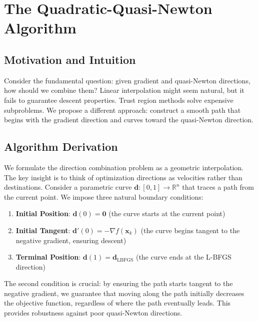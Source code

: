 \hypertarget{the-quadratic-quasi-newton-algorithm}{%
\section{The Quadratic-Quasi-Newton Algorithm}\label{the-quadratic-quasi-newton-algorithm}}

\hypertarget{motivation-and-intuition}{%
\subsection{Motivation and Intuition}\label{motivation-and-intuition}}

Consider the fundamental question: given gradient and quasi-Newton directions, how should we combine them?
Linear interpolation might seem natural, but it fails to guarantee descent properties.
Trust region methods solve expensive subproblems.
We propose a different approach: construct a smooth path that begins with the gradient direction and curves toward the quasi-Newton direction.

\hypertarget{algorithm-derivation}{%
\subsection{Algorithm Derivation}\label{algorithm-derivation}}

We formulate the direction combination problem as a geometric interpolation. The key insight is to think of optimization directions as velocities rather than destinations. Consider a parametric curve
\(\mathbf{d}: [0,1] \rightarrow \mathbb{R}^n\) that traces a path from the current point. We impose three natural boundary conditions:

\begin{enumerate}
\def\labelenumi{\arabic{enumi}.}
\tightlist
\item
  \textbf{Initial Position}: \(\mathbf{d}(0) = \mathbf{0}\) (the curve starts at the current point)
\item
  \textbf{Initial Tangent}: \(\mathbf{d}'(0) = -\nabla f(\mathbf{x}_k)\) (the curve begins tangent to the negative gradient, ensuring descent)
\item
  \textbf{Terminal Position}: \(\mathbf{d}(1) = \mathbf{d}_{\text{LBFGS}}\) (the curve ends at the L-BFGS direction)
\end{enumerate}

The second condition is crucial: by ensuring the path starts tangent to the negative gradient, we guarantee that moving along the path initially decreases the objective function, regardless of where the path eventually leads. This provides robustness against poor quasi-Newton directions.

